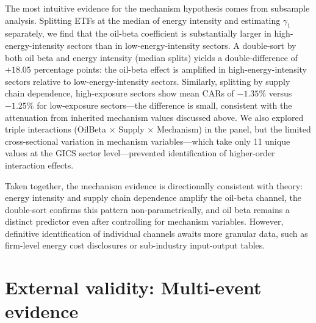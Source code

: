 \documentclass[12pt,preprint,authoryear]{elsarticle}
\begin{document}
The most intuitive evidence for the mechanism hypothesis comes from subsample analysis. Splitting ETFs at the median of energy intensity and estimating $\gamma_1$ separately, we find that the oil-beta coefficient is substantially larger in high-energy-intensity sectors than in low-energy-intensity sectors. A double-sort by both oil beta and energy intensity (median splits) yields a double-difference of $+18.05$ percentage points: the oil-beta effect is amplified in high-energy-intensity sectors relative to low-energy-intensity sectors. Similarly, splitting by supply chain dependence, high-exposure sectors show mean CARs of $-1.35\%$ versus $-1.25\%$ for low-exposure sectors---the difference is small, consistent with the attenuation from inherited mechanism values discussed above. We also explored triple interactions (OilBeta $\times$ Supply $\times$ Mechanism) in the panel, but the limited cross-sectional variation in mechanism variables---which take only 11 unique values at the GICS sector level---prevented identification of higher-order interaction effects.

Taken together, the mechanism evidence is directionally consistent with theory: energy intensity and supply chain dependence amplify the oil-beta channel, the double-sort confirms this pattern non-parametrically, and oil beta remains a distinct predictor even after controlling for mechanism variables. However, definitive identification of individual channels awaits more granular data, such as firm-level energy cost disclosures or sub-industry input-output tables.

\section{External validity: Multi-event evidence}\label{sec:external}
\end{document}
